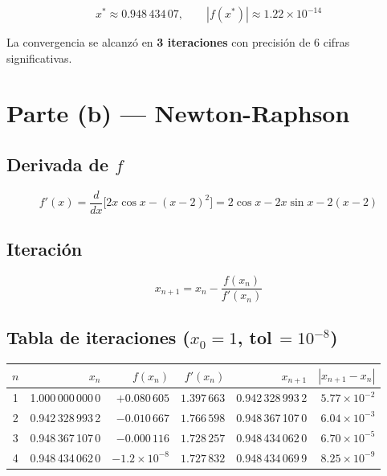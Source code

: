 \documentclass[12pt,a4paper]{article}
\begin{document}
\[
  \boxed{x^* \approx 0.948\,434\,07, \qquad |f(x^*)| \approx 1.22\times10^{-14}}
\]

La convergencia se alcanz\'o en \textbf{3 iteraciones} con precisi\'on de
6 cifras significativas.

\section*{Parte (b) --- Newton-Raphson}

\subsection*{Derivada de $f$}

\[
  f'(x) = \frac{d}{dx}\bigl[2x\cos x - (x-2)^2\bigr]
        = 2\cos x - 2x\sin x - 2(x-2)
\]

\subsection*{Iteraci\'on}

\[
  x_{n+1} = x_n - \frac{f(x_n)}{f'(x_n)}
\]

\subsection*{Tabla de iteraciones ($x_0 = 1$, tol\,$= 10^{-8}$)}

\begin{center}
\renewcommand{\arraystretch}{1.25}
\begin{tabular}{c r r r r r}
\toprule
$n$ & $x_n$ & $f(x_n)$ & $f'(x_n)$ & $x_{n+1}$ & $|x_{n+1}-x_n|$ \\
\midrule
1 & 1.000\,000\,000\,0 & $+0.080\,605$ & $1.397\,663$ & 0.942\,328\,993\,2 & $5.77\times10^{-2}$ \\
2 & 0.942\,328\,993\,2 & $-0.010\,667$ & $1.766\,598$ & 0.948\,367\,107\,0 & $6.04\times10^{-3}$ \\
3 & 0.948\,367\,107\,0 & $-0.000\,116$ & $1.728\,257$ & 0.948\,434\,062\,0 & $6.70\times10^{-5}$ \\
4 & 0.948\,434\,062\,0 & $-1.2\times10^{-8}$ & $1.727\,832$ & 0.948\,434\,069\,9 & $8.25\times10^{-9}$ \\
\bottomrule
\end{tabular}
\end{center}
\end{document}
